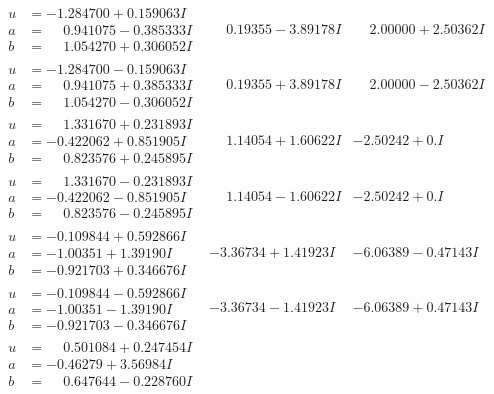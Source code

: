 \documentclass[1p]{elsarticle_modified}
\theoremstyle{definition}
\begin{document}
$$\begin{array}{c|c|c}
\begin{aligned}
u &= -1.284700 + 0.159063 I \\
a &= \phantom{-}0.941075 - 0.385333 I \\
b &= \phantom{-}1.054270 + 0.306052 I\end{aligned}
 & \phantom{-}0.19355 - 3.89178 I & \phantom{-}2.00000 + 2.50362 I \\ \hline\begin{aligned}
u &= -1.284700 - 0.159063 I \\
a &= \phantom{-}0.941075 + 0.385333 I \\
b &= \phantom{-}1.054270 - 0.306052 I\end{aligned}
 & \phantom{-}0.19355 + 3.89178 I & \phantom{-}2.00000 - 2.50362 I \\ \hline\begin{aligned}
u &= \phantom{-}1.331670 + 0.231893 I \\
a &= -0.422062 + 0.851905 I \\
b &= \phantom{-}0.823576 + 0.245895 I\end{aligned}
 & \phantom{-}1.14054 + 1.60622 I & -2.50242 + 0. I\phantom{ +0.000000I} \\ \hline\begin{aligned}
u &= \phantom{-}1.331670 - 0.231893 I \\
a &= -0.422062 - 0.851905 I \\
b &= \phantom{-}0.823576 - 0.245895 I\end{aligned}
 & \phantom{-}1.14054 - 1.60622 I & -2.50242 + 0. I\phantom{ +0.000000I} \\ \hline\begin{aligned}
u &= -0.109844 + 0.592866 I \\
a &= -1.00351 + 1.39190 I \\
b &= -0.921703 + 0.346676 I\end{aligned}
 & -3.36734 + 1.41923 I & -6.06389 - 0.47143 I \\ \hline\begin{aligned}
u &= -0.109844 - 0.592866 I \\
a &= -1.00351 - 1.39190 I \\
b &= -0.921703 - 0.346676 I\end{aligned}
 & -3.36734 - 1.41923 I & -6.06389 + 0.47143 I \\ \hline\begin{aligned}
u &= \phantom{-}0.501084 + 0.247454 I \\
a &= -0.46279 + 3.56984 I \\
b &= \phantom{-}0.647644 - 0.228760 I\end{aligned}

\end{array}$$
\end{document}
